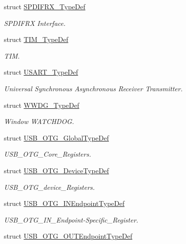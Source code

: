 \begin{DoxyCompactItemize}
struct \hyperlink{struct_s_p_d_i_f_r_x___type_def}{S\+P\+D\+I\+F\+R\+X\+\_\+\+Type\+Def}
\begin{DoxyCompactList}\small\item\em S\+P\+D\+I\+F\+RX Interface. \end{DoxyCompactList}\item 
struct \hyperlink{struct_t_i_m___type_def}{T\+I\+M\+\_\+\+Type\+Def}
\begin{DoxyCompactList}\small\item\em T\+IM. \end{DoxyCompactList}\item 
struct \hyperlink{struct_u_s_a_r_t___type_def}{U\+S\+A\+R\+T\+\_\+\+Type\+Def}
\begin{DoxyCompactList}\small\item\em Universal Synchronous Asynchronous Receiver Transmitter. \end{DoxyCompactList}\item 
struct \hyperlink{struct_w_w_d_g___type_def}{W\+W\+D\+G\+\_\+\+Type\+Def}
\begin{DoxyCompactList}\small\item\em Window W\+A\+T\+C\+H\+D\+OG. \end{DoxyCompactList}\item 
struct \hyperlink{struct_u_s_b___o_t_g___global_type_def}{U\+S\+B\+\_\+\+O\+T\+G\+\_\+\+Global\+Type\+Def}
\begin{DoxyCompactList}\small\item\em U\+S\+B\+\_\+\+O\+T\+G\+\_\+\+Core\+\_\+\+Registers. \end{DoxyCompactList}\item 
struct \hyperlink{struct_u_s_b___o_t_g___device_type_def}{U\+S\+B\+\_\+\+O\+T\+G\+\_\+\+Device\+Type\+Def}
\begin{DoxyCompactList}\small\item\em U\+S\+B\+\_\+\+O\+T\+G\+\_\+device\+\_\+\+Registers. \end{DoxyCompactList}\item 
struct \hyperlink{struct_u_s_b___o_t_g___i_n_endpoint_type_def}{U\+S\+B\+\_\+\+O\+T\+G\+\_\+\+I\+N\+Endpoint\+Type\+Def}
\begin{DoxyCompactList}\small\item\em U\+S\+B\+\_\+\+O\+T\+G\+\_\+\+I\+N\+\_\+\+Endpoint-\/\+Specific\+\_\+\+Register. \end{DoxyCompactList}\item 
struct \hyperlink{struct_u_s_b___o_t_g___o_u_t_endpoint_type_def}{U\+S\+B\+\_\+\+O\+T\+G\+\_\+\+O\+U\+T\+Endpoint\+Type\+Def}

\end{DoxyCompactItemize}
